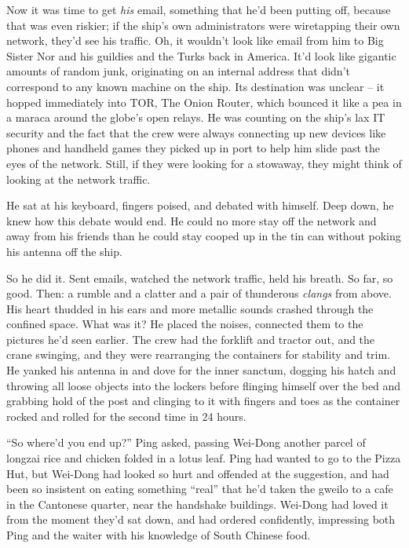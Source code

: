 Now it was time to get \emph{his} email, something that he'd been
putting off, because that was even riskier; if the ship's own
administrators were wiretapping their own network, they'd see his
traffic. Oh, it wouldn't look like email from him to Big Sister Nor
and his guildies and the Turks back in America. It'd look like
gigantic amounts of random junk, originating on an internal address
that didn't correspond to any known machine on the ship. Its
destination was unclear -- it hopped immediately into TOR, The
Onion Router, which bounced it like a pea in a maraca around the
globe's open relays. He was counting on the ship's lax IT security
and the fact that the crew were always connecting up new devices
like phones and handheld games they picked up in port to help him
slide past the eyes of the network. Still, if they were looking for
a stowaway, they might think of looking at the network traffic.

He sat at his keyboard, fingers poised, and debated with himself.
Deep down, he knew how this debate would end. He could no more stay
off the network and away from his friends than he could stay cooped
up in the tin can without poking his antenna off the ship.

So he did it. Sent emails, watched the network traffic, held his
breath. So far, so good. Then: a rumble and a clatter and a pair of
thunderous \emph{clangs} from above. His heart thudded in his ears
and more metallic sounds crashed through the confined space. What
was it? He placed the noises, connected them to the pictures he'd
seen earlier. The crew had the forklift and tractor out, and the
crane swinging, and they were rearranging the containers for
stability and trim. He yanked his antenna in and dove for the inner
sanctum, dogging his hatch and throwing all loose objects into the
lockers before flinging himself over the bed and grabbing hold of
the post and clinging to it with fingers and toes as the container
rocked and rolled for the second time in 24 hours.

\tb

``So where'd you end up?'' Ping asked, passing Wei-Dong another
parcel of longzai rice and chicken folded in a lotus leaf. Ping had
wanted to go to the Pizza Hut, but Wei-Dong had looked so hurt and
offended at the suggestion, and had been so insistent on eating
something ``real'' that he'd taken the gweilo to a cafe in the
Cantonese quarter, near the handshake buildings. Wei-Dong had loved
it from the moment they'd sat down, and had ordered confidently,
impressing both Ping and the waiter with his knowledge of South
Chinese food.


